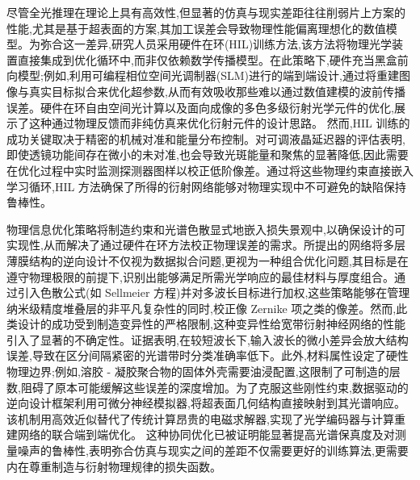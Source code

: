 \documentclass[11pt]{article}
\begin{document}
尽管全光推理在理论上具有高效性,但显著的仿真与现实差距往往削弱片上方案的性能,尤其是基于超表面的方案,其加工误差会导致物理性能偏离理想化的数值模型。为弥合这一差异,研究人员采用硬件在环(HIL)训练方法,该方法将物理光学装置直接集成到优化循环中,而非仅依赖数学传播模型。在此策略下,硬件充当黑盒前向模型;例如,利用可编程相位空间光调制器(SLM)进行的端到端设计,通过将重建图像与真实目标拟合来优化超参数,从而有效吸收那些难以通过数值建模的波前传播误差。硬件在环自由空间光计算以及面向成像的多色多级衍射光学元件的优化,展示了这种通过物理反馈而非纯仿真来优化衍射元件的设计思路。\citep{doi_10_1109_icton67126_2025_11125227_383c0a4a} 然而,HIL 训练的成功关键取决于精密的机械对准和能量分布控制。对可调液晶延迟器的评估表明,即使透镜功能间存在微小的未对准,也会导致光斑能量和聚焦的显著降低,因此需要在优化过程中实时监测探测器图样以校正低阶像差。通过将这些物理约束直接嵌入学习循环,HIL 方法确保了所得的衍射网络能够对物理实现中不可避免的缺陷保持鲁棒性。\citep{doi_10_1038_s41598_025_19638_8_1b2db1c9} \citep{doi_10_1364_oe_461549_b2d41b3f} \citep{doi_10_1021_acsphotonics_4c01284_s001_10346917}

物理信息优化策略将制造约束和光谱色散显式地嵌入损失景观中,以确保设计的可实现性,从而解决了通过硬件在环方法校正物理误差的需求。所提出的网络将多层薄膜结构的逆向设计不仅视为数据拟合问题,更视为一种组合优化问题,其目标是在遵守物理极限的前提下,识别出能够满足所需光学响应的最佳材料与厚度组合。通过引入色散公式(如 Sellmeier 方程)并对多波长目标进行加权,这些策略能够在管理纳米级精度堆叠层的非平凡复杂性的同时,校正像 Zernike 项之类的像差。然而,此类设计的成功受到制造变异性的严格限制,这种变异性给宽带衍射神经网络的性能引入了显著的不确定性。证据表明,在较短波长下,输入波长的微小差异会放大结构误差,导致在区分间隔紧密的光谱带时分类准确率低下。此外,材料属性设定了硬性物理边界;例如,溶胶 - 凝胶聚合物的固体外壳需要油浸配置,这限制了可制造的层数,阻碍了原本可能缓解这些误差的深度增加。为了克服这些刚性约束,数据驱动的逆向设计框架利用可微分神经模拟器,将超表面几何结构直接映射到其光谱响应。该机制用高效近似替代了传统计算昂贵的电磁求解器,实现了光学编码器与计算重建网络的联合端到端优化。\citep{s2_76a83ea3baed75ad88b7f0782eb9a694a330c853_cee16cac} \citep{doi_10_1002_admt_202401999_652aff4b} 这种协同优化已被证明能显著提高光谱保真度及对测量噪声的鲁棒性,表明弥合仿真与现实之间的差距不仅需要更好的训练算法,更需要内在尊重制造与衍射物理规律的损失函数。\citep{doi_10_1016_j_isci_2025_112222_1f7c10f5} \citep{doi_10_1002_adpr_202300310_6647aa64} \citep{s2_76a83ea3baed75ad88b7f0782eb9a694a330c853_cee16cac}
\end{document}
